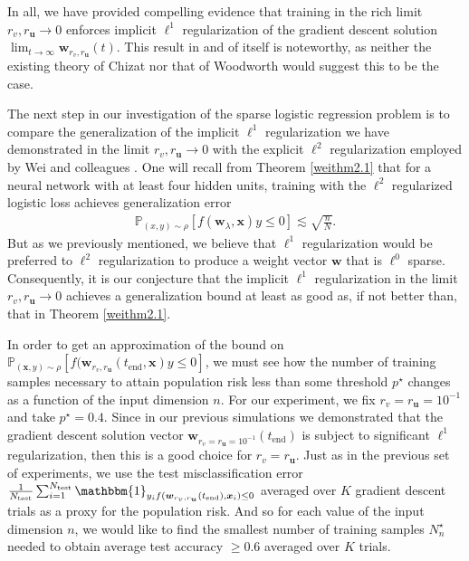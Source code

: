 \documentclass{article}
\begin{document}
In all, we have provided compelling evidence that training in the rich limit $r_{v}, r_{\boldsymbol{u}} \rightarrow 0$ enforces implicit $\ell^1$ regularization of the gradient descent solution $\lim_{t \to \infty} \boldsymbol{w}_{r_v, r_{\boldsymbol{u}}}(t)$. This result in and of itself is noteworthy, as neither the existing theory of Chizat nor that of Woodworth would suggest this to be the case. 

The next step in our investigation of the sparse logistic regression problem is to compare the generalization of the implicit $\ell^1$ regularization we have demonstrated in the limit $r_v, r_{\boldsymbol{u}} \rightarrow 0$ with the explicit $\ell^2$ regularization employed by Wei and colleagues \cite{wei2019regularization}. One will recall from Theorem \ref{weithm2.1} that for a neural network with at least four hidden units, training with the $\ell^2$ regularized logistic loss achieves generalization error
\begin{align*}
   \mathbb{P}_{(x,y) \sim \rho}[f(\boldsymbol{w}_{\lambda}, \boldsymbol{x})y \leq 0] \lesssim \sqrt{\frac{n}{N}}.
\end{align*}
But as we previously mentioned, we believe that $\ell^1$ regularization would be preferred to $\ell^2$ regularization to produce a weight vector $\boldsymbol{w}$ that is $\ell^0$ sparse. Consequently, it is our conjecture that the implicit $\ell^1$ regularization in the limit $r_v, r_{\boldsymbol{u}} \rightarrow 0$ achieves a generalization bound at least as good as, if not better than, that in Theorem \ref{weithm2.1}.

In order to get an approximation of the bound on $\mathbb{P}_{(\boldsymbol{x}, y) \sim \rho}[f(\boldsymbol{w}_{r_v, r_{\boldsymbol{u}}}(t_{\text{end}}, \boldsymbol{x})y \leq 0]$, we must see how the number of training samples necessary to attain population risk less than some threshold $p^{\star}$ changes as a function of the input dimension $n$. For our experiment, we fix $r_{v} = r_{\boldsymbol{u}} = 10^{-1}$ and take $p^{\star} = 0.4$. Since in our previous simulations we demonstrated that the gradient descent solution vector $\boldsymbol{w}_{r_v=r_{\boldsymbol{u}}=10^{-1}}(t_{\text{end}})$ is subject to significant $\ell^1$ regularization, then this is a good choice for $r_{v} = r_{\boldsymbol{u}}$. Just as in the previous set of experiments, we use the test misclassification error $\frac{1}{N_{\text{test}}} \sum_{i=1}^{N_{\text{test}}} \mathbbm{1}_{y_i f(\boldsymbol{w}_{r_v, r_{\boldsymbol{u}}}(t_{\text{end}}), \boldsymbol{x}_i) \leq 0}$ averaged over $K$ gradient descent trials as a proxy for the population risk. And so for each value of the input dimension $n$, we would like to find the smallest number of training samples $N_n^{\star}$ needed to obtain average test accuracy $\geq 0.6$ averaged over $K$ trials.
\end{document}
